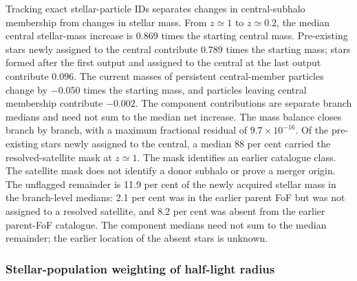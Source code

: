 \documentclass[usenatbib]{mnras}
\begin{document}
Tracking exact stellar-particle IDs separates changes in central-subhalo
membership from changes in stellar mass. From $z\simeq1$ to $z\simeq0.2$, the median
central stellar-mass increase is $0.869$ times the starting central mass.
Pre-existing stars newly assigned to the central contribute $0.789$ times
the starting mass; stars formed after the first output and assigned to the
central at the last output contribute $0.096$. The current masses of
persistent central-member particles change by $-0.050$ times the starting
mass, and particles leaving central membership contribute $-0.002$.
The component contributions are separate branch medians and need not sum to the median net
increase. The mass balance closes branch by branch, with a maximum fractional
residual of $9.7\times10^{-16}$. Of the pre-existing stars newly assigned
to the central, a median 88 per cent carried the resolved-satellite mask at
$z\simeq1$. The mask identifies an earlier catalogue class. The satellite mask does not
identify a donor subhalo or prove a merger origin. The unflagged remainder
is 11.9 per cent of the newly acquired stellar mass in the branch-level medians: 2.1 per cent was
in the earlier parent FoF but was not assigned to a resolved satellite, and
8.2 per cent was absent from the earlier parent-FoF catalogue. The
component medians need not sum to the median remainder; the earlier location
of the absent stars is unknown.

\subsubsection{Stellar-population weighting of half-light radius}
\end{document}
